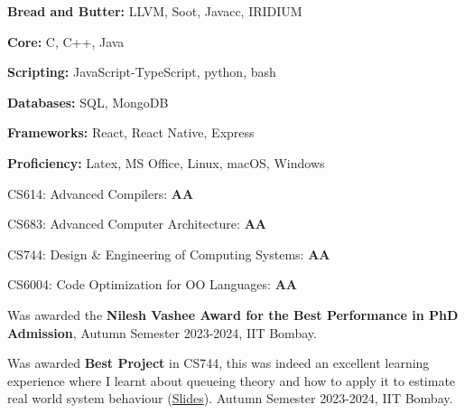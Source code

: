 \documentclass[10pt,a4paper,ragged2e]{altacv}
\begin{document}







{\bf Bread and Butter:} LLVM, Soot, Javacc, IRIDIUM
\smallskip

{\bf Core:} C, C++, Java
\smallskip

{\bf Scripting:} JavaScript-TypeScript, python, bash
\smallskip

{\bf Databases:} SQL, MongoDB
\smallskip

{\bf Frameworks:} React, React Native, Express
\smallskip

{\bf Proficiency:} Latex, MS Office, Linux, macOS, Windows
\smallskip

\smallskip
CS614: Advanced Compilers: \textbf{AA}
\smallskip

CS683: Advanced Computer Architecture: \textbf{AA}
\smallskip

CS744: Design \& Engineering of Computing Systems: \textbf{AA}
\smallskip

CS6004: Code Optimization for OO Languages: \textbf{AA}


Was awarded the \textbf{Nilesh Vashee Award for the Best Performance in PhD Admission}, Autumn Semester 2023-2024, IIT Bombay.
\smallskip


Was awarded \textbf{Best Project} in CS744, this was indeed an excellent learning experience where I learnt about queueing theory and how to apply it to estimate real world system behaviour (\href{https://www.dropbox.com/scl/fi/jn929eapbmib7v975u4im/DECServer_23D0361.pdf?rlkey=3ia4omysij0r0ozvz9d5dvk76&e=1&dl=0}{Slides}). Autumn Semester 2023-2024, IIT Bombay.
\smallskip
\end{document}
